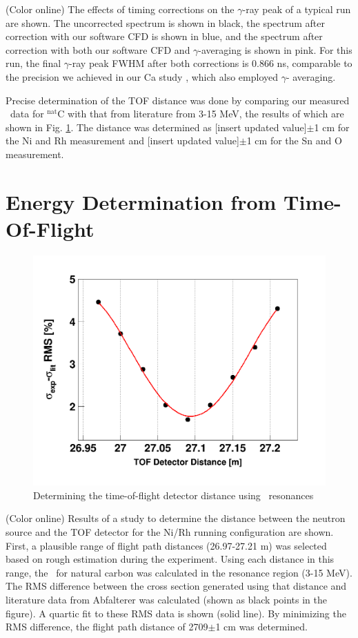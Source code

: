 (Color online) The effects of timing corrections on the $\gamma$-ray
        peak of a typical run are shown. The uncorrected spectrum is shown in black,
        the spectrum after correction with our software CFD is shown in blue,
        and the spectrum after correction with both our software CFD and
        $\gamma$-averaging is 
        shown in pink. For this run, the final $\gamma$-ray peak 
        FWHM after both corrections is 0.866 ns, comparable to the precision we
        achieved in our Ca study \cite{Shane2010}, which also employed $\gamma$-
        averaging.

Precise determination of the TOF distance was done by comparing our measured \tot\ data
for $^{\text{nat}}$C with that from literature from 3-15 MeV, the results of which are
shown in Fig. \ref{DistanceStudy}. The distance was determined as [insert
updated value]$\pm$1 cm for the Ni and Rh measurement and [insert updated value]$\pm$1 cm 
for the Sn and O measurement.


\section{Energy Determination from Time-Of-Flight}
\begin{figure}
    \includegraphics[scale=0.3]{figures/DistanceStudyNi.png}
    \caption{Determining the time-of-flight detector distance using \cNat\ resonances}
    \label{DistanceStudy}
\end{figure}

(Color online) Results of a study to determine the distance between
    the neutron source and the TOF detector for the Ni/Rh running configuration
are shown. First, a plausible range of flight path distances (26.97-27.21 m) was
selected based on rough estimation during the experiment. Using each
distance in this range, the \tot\ for natural carbon was calculated in the
resonance region (3-15 MeV). The RMS difference between the cross section
generated using that distance and literature data from Abfalterer
\cite{Abfalterer2000, Abfalterer2001} was calculated (shown as black points in
the figure). A quartic fit to these RMS data is shown (solid line). By minimizing the
RMS difference, the flight path distance of 2709$\pm$1 cm was determined.

